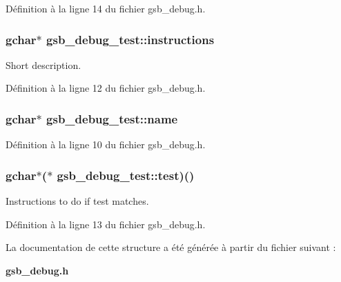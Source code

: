Définition à la ligne 14 du fichier gsb\_\-debug.h.

\subsubsection[{instructions}]{\setlength{\rightskip}{0pt plus 5cm}gchar$\ast$ {\bf gsb\_\-debug\_\-test::instructions}}\label{structgsb__debug__test_a64cca62deab47075983d30232c5ffd66}
Short description. 

Définition à la ligne 12 du fichier gsb\_\-debug.h.

\subsubsection[{name}]{\setlength{\rightskip}{0pt plus 5cm}gchar$\ast$ {\bf gsb\_\-debug\_\-test::name}}\label{structgsb__debug__test_a18bdf722e904d07735b2bbd18c200001}


Définition à la ligne 10 du fichier gsb\_\-debug.h.

\subsubsection[{test}]{\setlength{\rightskip}{0pt plus 5cm}gchar$\ast$($\ast$  {\bf gsb\_\-debug\_\-test::test})()}\label{structgsb__debug__test_aa7c27394a1df6c65cb51f19e0f1bf15e}
Instructions to do if test matches. 

Définition à la ligne 13 du fichier gsb\_\-debug.h.



La documentation de cette structure a été générée à partir du fichier suivant :\begin{DoxyCompactItemize}
\item 
{\bf gsb\_\-debug.h}\end{DoxyCompactItemize}
